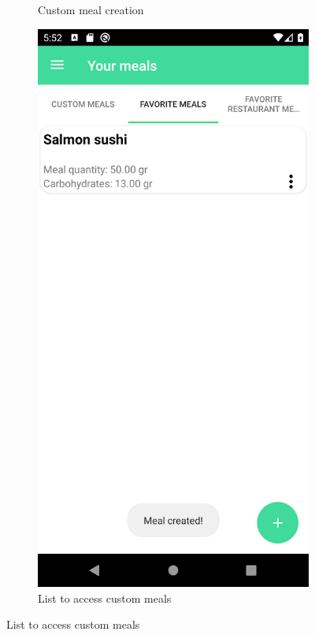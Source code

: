 \begin{figure}[H]
\begin{center}
\begin{subfigure}{.3\textwidth}
            \caption{Custom meal creation} 
        \end{subfigure}
        \begin{subfigure}{.3\textwidth}
            \includegraphics[scale=0.1, width=\textwidth]{_figures/custom_meal_after_creation.png}
            \caption{List to access custom meals} 
        \end{subfigure}%
    \end{center}
\end{figure}

